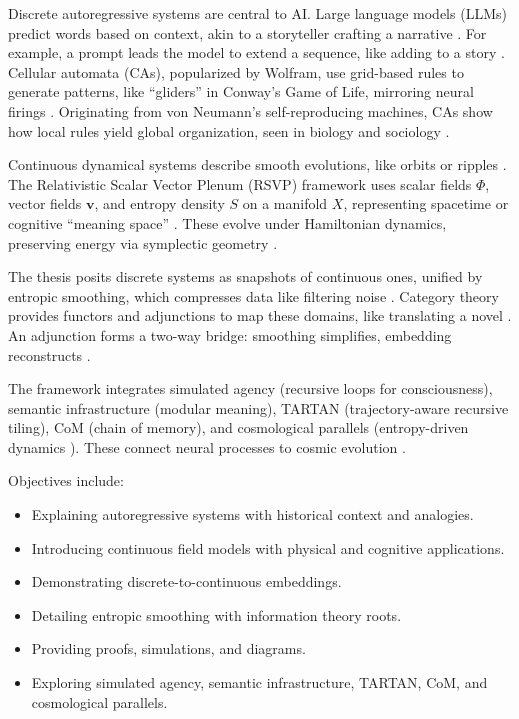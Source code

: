 \documentclass[a4paper,12pt]{article}
\theoremstyle{definition}
\begin{document}
Discrete autoregressive systems are central to AI. Large language models (LLMs) predict words based on context, akin to a storyteller crafting a narrative \cite{Vaswani2017, Brown2020, Devlin2019, Radford2019, Lewis2020, Raffel2020, Yang2019, Liu2019}. For example, a prompt leads the model to extend a sequence, like adding to a story \cite{Wolfram2002}. Cellular automata (CAs), popularized by Wolfram, use grid-based rules to generate patterns, like “gliders” in Conway’s Game of Life, mirroring neural firings \cite{Neumann1966, Conway1970, Gardner1970}. Originating from von Neumann’s self-reproducing machines, CAs show how local rules yield global organization, seen in biology and sociology \cite{Yule1927, Rosenblatt1958, Edelman2004}.

Continuous dynamical systems describe smooth evolutions, like orbits or ripples \cite{Newton1687, Lagrange1788, Hamilton1834}. The Relativistic Scalar Vector Plenum (RSVP) framework uses scalar fields \(\Phi\), vector fields \(\mathbf{v}\), and entropy density \( S \) on a manifold \( X \), representing spacetime or cognitive “meaning space” \cite{Carroll2019, Lloyd2006}. These evolve under Hamiltonian dynamics, preserving energy via symplectic geometry \cite{Arnold1989, Marsden1974, Batalin1981}.

The thesis posits discrete systems as snapshots of continuous ones, unified by entropic smoothing, which compresses data like filtering noise \cite{Shannon1948, Shannon1951, Kolmogorov1965, Cover1991, Jaynes1957}. Category theory provides functors and adjunctions to map these domains, like translating a novel \cite{Eilenberg1945, MacLane1998, Lurie2009}. An adjunction forms a two-way bridge: smoothing simplifies, embedding reconstructs \cite{Toen2014}.

The framework integrates simulated agency (recursive loops for consciousness), semantic infrastructure (modular meaning), TARTAN (trajectory-aware recursive tiling), CoM (chain of memory), and cosmological parallels (entropy-driven dynamics \cite{Verlinde2011, Bekenstein1973, Hawking1975, Susskind1995, Witten1998, Hooft1993}). These connect neural processes to cosmic evolution \cite{Lloyd2006, Penrose1989}.

Objectives include:
\begin{itemize}
    \item Explaining autoregressive systems with historical context and analogies.
    \item Introducing continuous field models with physical and cognitive applications.
    \item Demonstrating discrete-to-continuous embeddings.
    \item Detailing entropic smoothing with information theory roots.
    \item Providing proofs, simulations, and diagrams.
    \item Exploring simulated agency, semantic infrastructure, TARTAN, CoM, and cosmological parallels.
\end{itemize}
\end{document}
